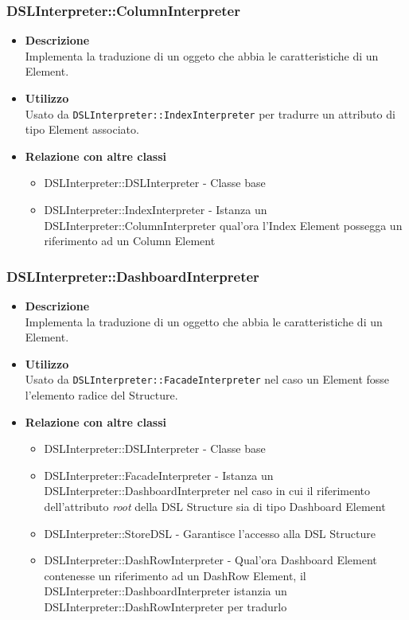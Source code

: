 \subsubsection{DSLInterpreter::ColumnInterpreter}
\begin{itemize}
\item \textbf{Descrizione} \hfill \\
Implementa la traduzione di un oggeto che abbia le caratteristiche di un  Element.
\item \textbf{Utilizzo} \hfill \\
Usato da \texttt{DSLInterpreter::IndexInterpreter} per tradurre un attributo di tipo  Element associato.
\item \textbf{Relazione con altre classi}
\begin{itemize}
\item DSLInterpreter::DSLInterpreter - Classe base
\item DSLInterpreter::IndexInterpreter - Istanza un DSLInterpreter::ColumnInterpreter qual'ora l'Index Element possegga un riferimento ad un Column Element
\end{itemize}
\end{itemize}

\subsubsection{DSLInterpreter::DashboardInterpreter}
\begin{itemize}
\item \textbf{Descrizione} \hfill \\
Implementa la traduzione di un oggetto che abbia le caratteristiche di un  Element.
\item \textbf{Utilizzo} \hfill \\
Usato da \texttt{DSLInterpreter::FacadeInterpreter} nel caso un  Element fosse l'elemento radice del  Structure. 
\item \textbf{Relazione con altre classi}
\begin{itemize}
\item DSLInterpreter::DSLInterpreter - Classe base
\item DSLInterpreter::FacadeInterpreter - Istanza un DSLInterpreter::DashboardInterpreter nel caso in cui il riferimento dell'attributo \textit{root} della DSL Structure sia di tipo Dashboard Element 
\item DSLInterpreter::StoreDSL - Garantisce l'accesso alla DSL Structure
\item DSLInterpreter::DashRowInterpreter - Qual'ora Dashboard Element contenesse un riferimento ad un DashRow Element, il DSLInterpreter::DashboardInterpreter istanzia un DSLInterpreter::DashRowInterpreter per tradurlo
\end{itemize}
\end{itemize}


